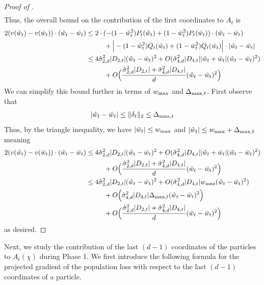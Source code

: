 \begin{proof}[Proof of ]
\begin{align}
\end{align}
Thus, the overall bound on the contribution of the first coordinates to $A_t$ is
\begin{align}
2(v(\hat{w}_t) - v(\bar{w}_t)) \cdot (\hat{w}_t - \bar{w}_t)
& \leq 2 \cdot (-(1 - \hat{w}_t^2) P_t(\hat{w}_t) + (1 - \bar{w}_t^2) P_t(\bar{w}_t) ) \cdot (\hat{w}_t - \bar{w}_t) \\
& \,\,\,\,\,\,\,\,\,\,\,\,\,\,\,\, + \Big|-(1 - \hat{w}_t^2) Q_t(\hat{w}_t) + (1 - \bar{w}_t^2) Q_t(\bar{w}_t) \Big| \cdot |\hat{w}_t - \bar{w}_t| \\
& \leq 4 \hat{\sigma}_{2, d}^2 |D_{2,t}| (\hat{w}_t - \bar{w}_t)^2 + O(\hat{\sigma}_{4, d}^2 |D_{4,t}| |\hat{w}_t + \bar{w}_t| (\hat{w}_t - \bar{w}_t)^2) \\
& \,\,\,\,\,\,\,\,\,\,\,\,\,\,\,\, + O\Big(\frac{\hat{\sigma}_{2, d}^2 |D_{2, t}| + \hat{\sigma}_{4, d}^2 |D_{4, t}|}{d} (\hat{w}_t - \bar{w}_t)^2 \Big)
\end{align}
We can simplify this bound further in terms of ${w_{\textup{max}}}$ and $\Delta_{\textup{max}, t}$. First observe that
\begin{align}
|\hat{w}_t - \bar{w}_t| \leq \|\delta_t\|_2 \leq \Delta_{\textup{max}, t}
\end{align}
Thus, by the triangle inequality, we have $|\bar{w}_t| \leq {w_{\textup{max}}}$ and $|\hat{w}_t| \leq {w_{\textup{max}}} + \Delta_{\textup{max}, t}$ meaning
\begin{align}
2(v(\hat{w}_t) - v(\bar{w}_t)) \cdot (\hat{w}_t - \bar{w}_t)
& \leq 4 \hat{\sigma}_{2, d}^2 |D_{2,t}| (\hat{w}_t - \bar{w}_t)^2 + O(\hat{\sigma}_{4, d}^2 |D_{4,t}| |\hat{w}_t + \bar{w}_t| (\hat{w}_t - \bar{w}_t)^2) \\
& \,\,\,\,\,\,\,\,\,\,\,\,\,\,\,\, + O\Big(\frac{\hat{\sigma}_{2, d}^2 |D_{2, t}| + \hat{\sigma}_{4, d}^2 |D_{4, t}|}{d} (\hat{w}_t - \bar{w}_t)^2 \Big) \\
& \leq 4 \hat{\sigma}_{2, d}^2 |D_{2,t}| (\hat{w}_t - \bar{w}_t)^2 + O(\hat{\sigma}_{4, d}^2 |D_{4,t}| {w_{\textup{max}}} (\hat{w}_t - \bar{w}_t)^2) \\
& \,\,\,\,\,\,\,\,\,\,\,\,\,\,\,\, + O\Big(\hat{\sigma}_{4, d}^2 |D_{4,t}| \Delta_{\textup{max}, t} (\hat{w}_t - \bar{w}_t)^2\Big) \\
& \,\,\,\,\,\,\,\,\,\,\,\,\,\,\,\, + O\Big(\frac{\hat{\sigma}_{2, d}^2 |D_{2, t}| + \hat{\sigma}_{4, d}^2 |D_{4, t}|}{d} (\hat{w}_t - \bar{w}_t)^2 \Big) \\
\end{align}
as desired.
\end{proof}

Next, we study the contribution of the last $(d - 1)$ coordinates of the particles to $A_t(\chi)$ during Phase 1. We first introduce the following formula for the projected gradient of the population loss with respect to the last $(d - 1)$ coordinates of a particle.

